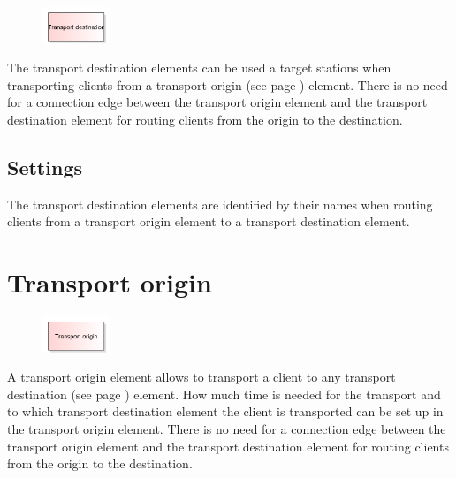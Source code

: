\begin{figure}
\vspace{-22pt}
\includegraphics[width=2cm]{imageModelElementTransportDestination.png}
\vspace{-22pt}
\end{figure}

The transport destination elements can be used a target stations when transporting
clients from a transport origin (see page \pageref{ref:ModelElementTransportSource}) 
element. There is no need for a connection edge between the transport origin element
and the transport destination element for routing clients from the origin to the
destination.

\subsection*{Settings}

The transport destination elements are identified by their names when routing
clients from a transport origin element to a transport destination element.


\section{Transport origin}
\label{ref:ModelElementTransportSource}

\begin{figure}
\vspace{-22pt}
\includegraphics[width=2cm]{imageModelElementTransportSource.png}
\vspace{-22pt}
\end{figure}

A transport origin element allows to transport a client to any
transport destination (see page \pageref{ref:ModelElementTransportDestination}) 
element. How much time is needed for the transport and to which
transport destination element the client is transported can be set up
in the transport origin element. 
There is no need for a connection edge between the transport origin element
and the transport destination element for routing clients from the origin to the
destination.

